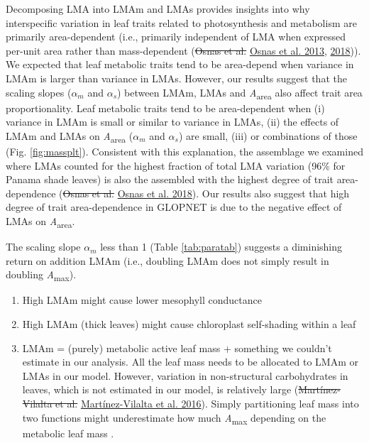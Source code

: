 \documentclass[
  12pt,
]{article}
\providecommand{\tightlist}{%
  \setlength{\itemsep}{0pt}\setlength{\parskip}{0pt}}
\providecommand{\DIFaddtex}[1]{{\protect\color{blue}\uwave{#1}}} %
\providecommand{\DIFdeltex}[1]{{\protect\color{red}\sout{#1}}}                      %
\providecommand{\DIFaddbegin}{} %
\providecommand{\DIFaddend}{} %
\providecommand{\DIFdelbegin}{} %
\providecommand{\DIFdelend}{} %
\providecommand{\DIFadd}[1]{\texorpdfstring{\DIFaddtex{#1}}{#1}} %
\providecommand{\DIFdel}[1]{\texorpdfstring{\DIFdeltex{#1}}{}} %
\newcommand{\DIFscaledelfig}{0.5}
\newlength{\DIFdelgraphicswidth} %
\newlength{\DIFdelgraphicsheight} %
\newcommand{\DIFaddincludegraphics}[2][]{{\color{blue}\fbox{\DIFOincludegraphics[#1]{#2}}}} %
\newcommand{\DIFdelincludegraphics}[2][]{%
\sbox{\DIFdelgraphicsbox}{\DIFOincludegraphics[#1]{#2}}%
\settoboxwidth{\DIFdelgraphicswidth}{\DIFdelgraphicsbox} %
\settoboxtotalheight{\DIFdelgraphicsheight}{\DIFdelgraphicsbox} %
\scalebox{\DIFscaledelfig}{%
\parbox[b]{\DIFdelgraphicswidth}{\usebox{\DIFdelgraphicsbox}\\[-\baselineskip] \rule{\DIFdelgraphicswidth}{0em}}\llap{\resizebox{\DIFdelgraphicswidth}{\DIFdelgraphicsheight}{%
\setlength{\unitlength}{\DIFdelgraphicswidth}%
\begin{picture}(1,1)%
\thicklines\linethickness{2pt} %
{\color[rgb]{1,0,0}\put(0,0){\framebox(1,1){}}}%
{\color[rgb]{1,0,0}\put(0,0){\line( 1,1){1}}}%
{\color[rgb]{1,0,0}\put(0,1){\line(1,-1){1}}}%
\end{picture}%
}\hspace*{3pt}}} %
} %
\DeclareRobustCommand{\DIFaddbegin}{\DIFOaddbegin \let\includegraphics\DIFaddincludegraphics} %
\DeclareRobustCommand{\DIFaddend}{\DIFOaddend \let\includegraphics\DIFOincludegraphics} %
\DeclareRobustCommand{\DIFdelbegin}{\DIFOdelbegin \let\includegraphics\DIFdelincludegraphics} %
\DeclareRobustCommand{\DIFdelend}{\DIFOaddend \let\includegraphics\DIFOincludegraphics} %
\begin{document}
Decomposing LMA into LMAm and LMAs provides insights into why interspecific variation in leaf traits related to photosynthesis and metabolism are primarily area-dependent (i.e., primarily independent of LMA when expressed per-unit area rather than mass-dependent (\DIFdelbegin \DIFdel{Osnas et al. }\DIFdelend \protect\DIFdelbegin %
\DIFdelend \DIFaddbegin \hyperlink{ref-Osnas2013}{Osnas et al. 2013}\DIFaddend , \protect\hyperlink{ref-Osnas2018}{2018})).
We expected that leaf metabolic traits tend to be area-depend when variance in LMAm is larger than variance in LMAs.
However, our results suggest that the scaling slopes (\DIFdelbegin \DIFdel{\(\alpha_m\) }\DIFdelend \DIFaddbegin \DIFadd{\(\alpha_p\) }\DIFaddend and \(\alpha_s\)) between LMAm, LMAs and \emph{A}\textsubscript{area} also affect trait area proportionality.
Leaf metabolic traits tend to be area-dependent when (i) variance in LMAm is small or similar to variance in LMAs, (ii) the effects of LMAm and LMAs on \emph{A}\textsubscript{area} (\DIFdelbegin \DIFdel{\(\alpha_m\) }\DIFdelend \DIFaddbegin \DIFadd{\(\alpha_p\) }\DIFaddend and \(\alpha_s\)) are small, (iii) or combinations of those (Fig. \DIFaddbegin \DIFadd{Fig.~}\DIFaddend \ref{fig:massplt}).
Consistent with this explanation, the assemblage we examined where LMAs counted for the highest fraction of total LMA variation (96\% for Panama shade leaves) is also the assembled with the highest degree of trait area-dependence (\DIFdelbegin \DIFdel{Osnas et al. }\DIFdelend \protect\DIFdelbegin %
\DIFdelend \DIFaddbegin \hyperlink{ref-Osnas2018}{Osnas et al. 2018}\DIFaddend ).
Our results also suggest that high degree of trait area-dependence in GLOPNET is due to the negative effect of LMAs on \emph{A}\textsubscript{area}.

The scaling slope \DIFdelbegin \DIFdel{\(\alpha_m\) }\DIFdelend \DIFaddbegin \DIFadd{\(\alpha_p\) }\DIFaddend less than 1 (Table \ref{tab:paratab}) suggests a diminishing return on addition LMAm (i.e., doubling LMAm does not simply result in doubling \emph{A}\textsubscript{max}).

\begin{enumerate}
\def\labelenumi{\arabic{enumi}.}
\tightlist
\item
  High LMAm might cause lower mesophyll conductance
\item
  High LMAm (thick leaves) might cause chloroplast self-shading within a leaf
\item
  LMAm = (purely) metabolic active leaf mass + something we couldn't estimate in our analysis. All the leaf mass needs to be allocated to LMAm or LMAs in our model. However, variation in non-structural carbohydrates in leaves, which is not estimated in our model, is relatively large (\DIFdelbegin \DIFdel{Martínez-Vilalta et al. }\DIFdelend \protect\DIFdelbegin %
\DIFdelend \DIFaddbegin \hyperlink{ref-Martinez-Vilalta2016}{Martínez-Vilalta et al. 2016}\DIFaddend ). Simply partitioning leaf mass into two functions might underestimate how much \emph{A}\textsubscript{max} depending on the metabolic leaf mass .
\end{enumerate}
\end{document}
